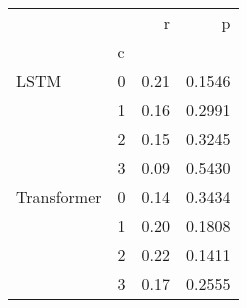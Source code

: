 \begin{tabular}{llrr}
\toprule
            &   &    r &      p \\
{} & c &      &        \\
\midrule
LSTM & 0 & 0.21 & 0.1546 \\
            & 1 & 0.16 & 0.2991 \\
            & 2 & 0.15 & 0.3245 \\
            & 3 & 0.09 & 0.5430 \\
Transformer & 0 & 0.14 & 0.3434 \\
            & 1 & 0.20 & 0.1808 \\
            & 2 & 0.22 & 0.1411 \\
            & 3 & 0.17 & 0.2555 \\
\bottomrule
\end{tabular}
